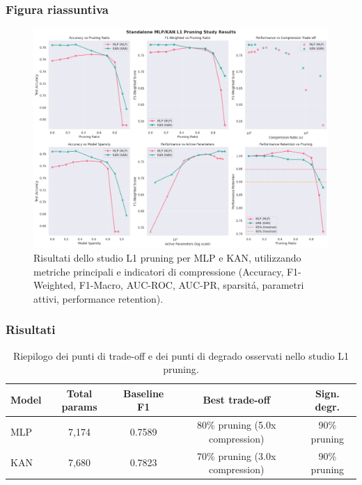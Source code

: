\documentclass[a4paper,12pt]{report}
\begin{document}
	\subsubsection{Figura riassuntiva}
	\begin{figure}[H]
		\centering
		\includegraphics[width=1.0\textwidth]{img/abl_kanvsmlp_pm.png}
		\caption{Risultati dello studio L1 pruning per MLP e KAN, utilizzando metriche principali e indicatori di compressione (Accuracy, F1-Weighted, F1-Macro, AUC-ROC, AUC-PR, sparsitá, parametri attivi, performance retention).}
	\end{figure}
	
	\subsubsection{Risultati}
	\begin{table}[H]
		\centering
		\setlength{\tabcolsep}{4pt}
		\begin{tabular}{lcccc}
			\toprule
			\textbf{Model} & \textbf{Total params} & \textbf{Baseline F1} & \textbf{Best trade-off} & \textbf{Sign. degr.} \\
			\midrule
			MLP & 7,174   & 0.7589 & 80\% pruning (5.0x compression) & 90\% pruning \\
			KAN & 7,680   & 0.7823 & 70\% pruning (3.0x compression) & 90\% pruning \\
			\bottomrule
		\end{tabular}
		\caption{Riepilogo dei punti di trade-off e dei punti di degrado osservati nello studio L1 pruning.}
	\end{table}
	
\end{document}
